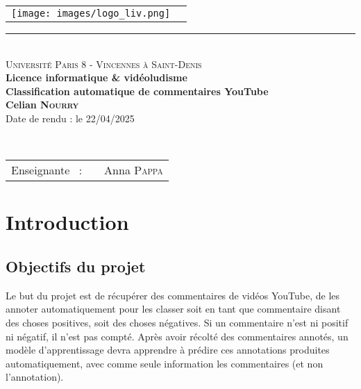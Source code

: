 \documentclass[a4paper, 12pt, openany]{book}
\begin{document}
\begin{titlepage}
  \begin{center}
    \begin{tabular*}{\textwidth}{l@{\extracolsep{\fill}}r}
      \texttt{[image: images/logo\_liv.png]}
    \end{tabular*}
    \small 
    \rule{\textwidth}{.5pt}~\\
    \large 
    \textsc{Université Paris 8 - Vincennes à Saint-Denis}\vspace{0.5cm}\\
    \textbf{Licence informatique \& vidéoludisme}\vspace{3.0cm}\\
    \Large
    \textbf{Classification automatique de commentaires YouTube}\vspace{1.5cm}\\
    \large
    \textbf{Celian \textsc{Nourry}}\vspace{0.5cm}\\
    Date de rendu : le 22/04/2025\vspace{1.75cm}\\
  \end{center}\vspace{1.5cm}~\\
  \begin{tabular}{ll}
    \hspace{-0.45cm}Enseignante ~:~&~Anna \textsc{Pappa}\\
  \end{tabular}
\end{titlepage}
\renewcommand{\contentsname}{Table des matières}
\tableofcontents

\chapter*{Introduction}
\section*{Objectifs du projet}
Le but du projet est de récupérer des commentaires de vidéos YouTube, de les annoter automatiquement pour les classer soit en tant que commentaire disant des choses positives, soit des choses négatives. Si un commentaire n'est ni positif ni négatif, il n'est pas compté. Après avoir récolté des commentaires annotés, un modèle d'apprentissage devra apprendre à prédire ces annotations produites automatiquement, avec comme seule information les commentaires (et non l'annotation).
\end{document}
